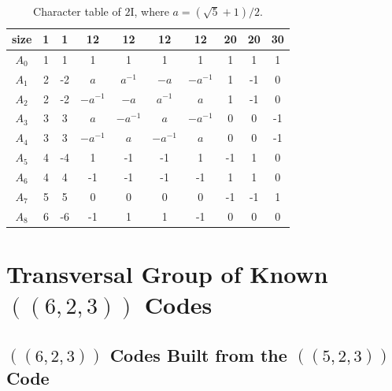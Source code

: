 \documentclass[8pt]{article}
\theoremstyle{definition}
\begin{document}
\begin{table}[h]
    \centering
    \renewcommand{\arraystretch}{1.2}
    \begin{tabular}{c|ccccccccc}
        \hline
        size    & 1 & 1  & 12        & 12        & 12        & 12        & 20 & 20 & 30 \\
        \hline
        $A_{0}$ & 1 & 1  & 1         & 1         & 1         & 1         & 1  & 1  & 1  \\
        $A_{1}$ & 2 & -2 & $a$       & $a^{-1}$  & $-a$      & $-a^{-1}$ & 1  & -1 & 0  \\
        $A_{2}$ & 2 & -2 & $-a^{-1}$ & $-a$      & $a^{-1}$  & $a$       & 1  & -1 & 0  \\
        $A_{3}$ & 3 & 3  & $a$       & $-a^{-1}$ & $a$       & $-a^{-1}$ & 0  & 0  & -1 \\
        $A_{4}$ & 3 & 3  & $-a^{-1}$ & $a$       & $-a^{-1}$ & $a$       & 0  & 0  & -1 \\
        $A_{5}$ & 4 & -4 & 1         & -1        & -1        & 1         & -1 & 1  & 0  \\
        $A_{6}$ & 4 & 4  & -1        & -1        & -1        & -1        & 1  & 1  & 0  \\
        $A_{7}$ & 5 & 5  & 0         & 0         & 0         & 0         & -1 & -1 & 1  \\
        $A_{8}$ & 6 & -6 & -1        & 1         & 1         & -1        & 0  & 0  & 0  \\
        \hline
    \end{tabular}
    \caption{\label{tab:2I-char}Character table of \(2\mathrm{I}\), where \(a = (\sqrt{5}+1)/2\).}
\end{table}

\section{Transversal Group of Known \texorpdfstring{$((6,2,3))$}{((6,2,3))} Codes}\label{appendix:623families}

\subsection{\texorpdfstring{$((6,2,3))$}{((6,2,3))} Codes Built from the \texorpdfstring{$((5,2,3))$}{((5,2,3))} Code}
\end{document}
